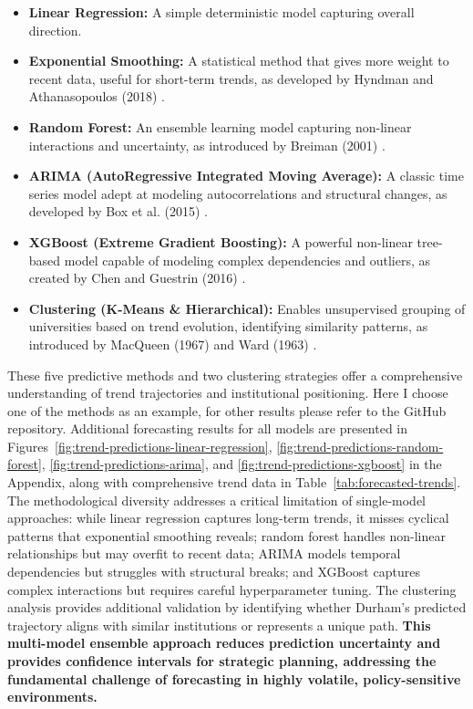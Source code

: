 \documentclass[journal,onecolumn, 10pt,draftclsnofoot]{IEEEtran}
\begin{document}
\begin{itemize}
    \item \textbf{Linear Regression:} A simple deterministic model capturing overall direction.
    \item \textbf{Exponential Smoothing:} A statistical method that gives more weight to recent data, useful for short-term trends, as developed by Hyndman and Athanasopoulos (2018) \cite{hyndman2018forecasting}.
    \item \textbf{Random Forest:} An ensemble learning model capturing non-linear interactions and uncertainty, as introduced by Breiman (2001) \cite{breiman2001random}.
    \item \textbf{ARIMA (AutoRegressive Integrated Moving Average):} A classic time series model adept at modeling autocorrelations and structural changes, as developed by Box et al. (2015) \cite{box2015time}.
    \item \textbf{XGBoost (Extreme Gradient Boosting):} A powerful non-linear tree-based model capable of modeling complex dependencies and outliers, as created by Chen and Guestrin (2016) \cite{chen2016xgboost}.
    \item \textbf{Clustering (K-Means \& Hierarchical):} Enables unsupervised grouping of universities based on trend evolution, identifying similarity patterns, as introduced by MacQueen (1967) \cite{macqueen1967methods} and Ward (1963) \cite{ward1963hierarchical}.
\end{itemize}

These five predictive methods and two clustering strategies offer a comprehensive understanding of trend trajectories and institutional positioning. Here I choose one of the methods as an example, for other results please refer to the GitHub repository. Additional forecasting results for all models are presented in Figures~\ref{fig:trend-predictions-linear-regression}, \ref{fig:trend-predictions-random-forest}, \ref{fig:trend-predictions-arima}, and \ref{fig:trend-predictions-xgboost} in the Appendix, along with comprehensive trend data in Table~\ref{tab:forecasted-trends}. The methodological diversity addresses a critical limitation of single-model approaches: while linear regression captures long-term trends, it misses cyclical patterns that exponential smoothing reveals; random forest handles non-linear relationships but may overfit to recent data; ARIMA models temporal dependencies but struggles with structural breaks; and XGBoost captures complex interactions but requires careful hyperparameter tuning. The clustering analysis provides additional validation by identifying whether Durham's predicted trajectory aligns with similar institutions or represents a unique path. \textbf{This multi-model ensemble approach reduces prediction uncertainty and provides confidence intervals for strategic planning, addressing the fundamental challenge of forecasting in highly volatile, policy-sensitive environments.}
\end{document}
